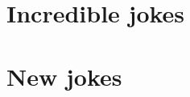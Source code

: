 \documentclass[11pt,a4paper,oneside]{book}
\begin{document}
\part{Incredible jokes}
\label{part:ij}

%

\part{New jokes}
\label{part:nj}
%
%
%

    

\backmatter
\printindex %


\nocite{*}
\end{document}
